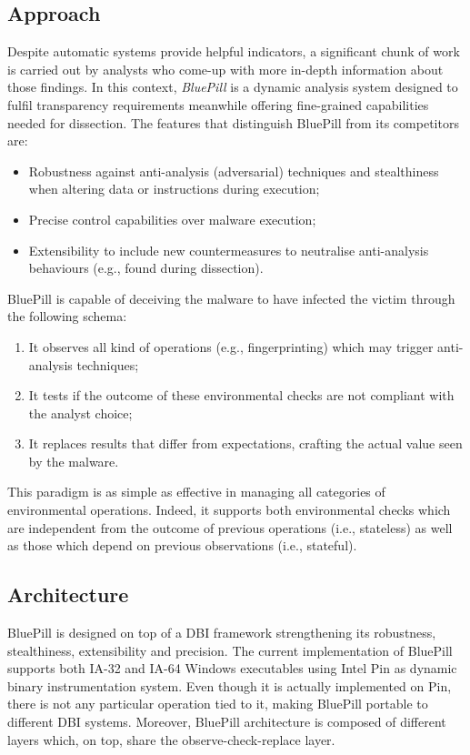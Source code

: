 \documentclass[LaM,binding=0.6cm]{sapthesis}
\begin{document}
\subsection{Approach}
Despite automatic systems provide helpful indicators, a significant chunk of work is carried out by analysts who come-up with more in-depth information about those findings. In this context, \textit{BluePill}\cite{bho} is a dynamic analysis system designed to fulfil transparency requirements meanwhile offering fine-grained capabilities needed for dissection. The features that distinguish BluePill from its competitors are:
\begin{itemize}
\item Robustness against anti-analysis (adversarial) techniques and stealthiness when altering data or instructions during execution;
\item Precise control capabilities over malware execution;
\item Extensibility to include new countermeasures to neutralise anti-analysis behaviours (e.g., found during dissection).
\end{itemize}
BluePill is capable of deceiving the malware to have infected the victim through the following schema:
\begin{enumerate}
\item It observes all kind of operations (e.g., fingerprinting) which may trigger anti-analysis techniques;
\item It tests if the outcome of these environmental checks are not compliant with the analyst choice;
\item It replaces results that differ from expectations, crafting the actual value seen by the malware.  
\end{enumerate}
This paradigm is as simple as effective in managing all categories of environmental operations. Indeed, it supports both environmental checks which are independent from the outcome of previous operations (i.e., stateless) as well as those which depend on previous observations (i.e., stateful).

\subsection{Architecture}
BluePill is designed on top of a DBI framework strengthening its robustness, stealthiness, extensibility and precision. The current implementation of BluePill supports both IA-32 and IA-64 Windows executables using Intel Pin as dynamic binary instrumentation system. Even though it is actually implemented on Pin, there is not any particular operation tied to it, making BluePill portable to different DBI systems. Moreover, BluePill architecture is composed of different layers which, on top, share the observe-check-replace layer.
\end{document}
